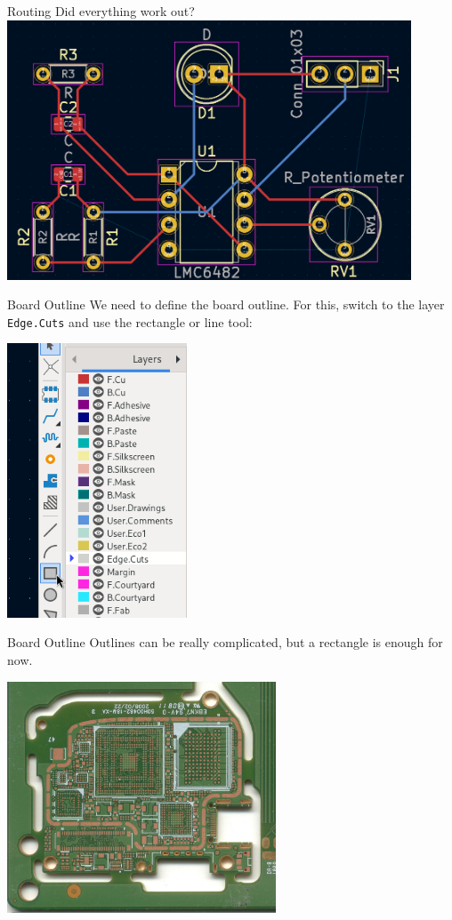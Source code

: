\documentclass{beamer}
\begin{document}
\begin{frame}{Routing}
  Did everything work out?\\
  \includegraphics[width=0.9\textwidth]{images/all-routed.png}
\end{frame}

\begin{frame}{Board Outline}
  We need to define the board outline. For this, switch to the layer \texttt{Edge.Cuts} and use the rectangle or line tool:
  \begin{center}
    \includegraphics[width=0.4\textwidth]{images/add-board-outline.png}
  \end{center}
\end{frame}

\begin{frame}{Board Outline}
  Outlines can be really complicated, but a rectangle is enough for now.\\
  \begin{center}
    \includegraphics[width=0.6\textwidth]{images/complicated-outline.png}
  \end{center}
\end{frame}
\end{document}
